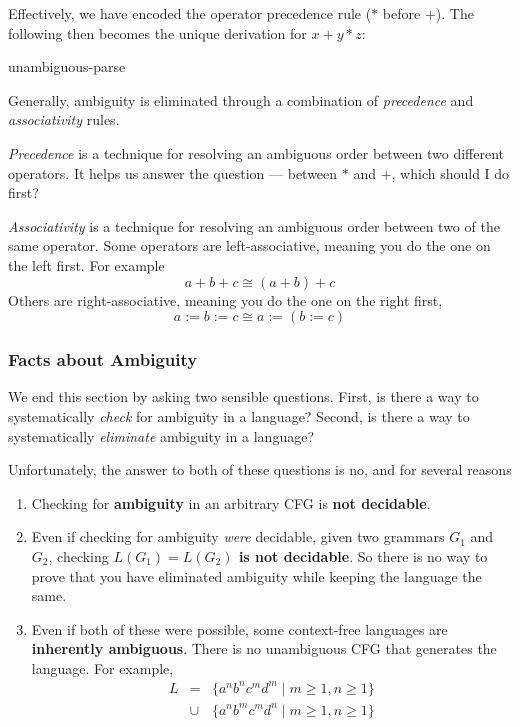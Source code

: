 Effectively, we have encoded the operator precedence rule ($*$ before $+$). The following then becomes the unique derivation for $x + y * z$:

\begin{center}
    {unambiguous-parse}
\end{center}

Generally, ambiguity is eliminated through a combination of \textit{precedence} and \textit{associativity} rules. 

\textit{Precedence} is a technique for resolving an ambiguous order between two different operators. It helps us answer the question --- between $*$ and $+$, which should I do first?

\textit{Associativity} is a technique for resolving an ambiguous order between two of the same operator. Some operators are left-associative, meaning you do the one on the left first. For example
\[a + b + c \cong (a + b) + c\]
Others are right-associative, meaning you do the one on the right first,
\[a := b := c \cong a:= (b := c) \]
\subsubsection{Facts about Ambiguity}
We end this section by asking two sensible questions. First, is there a way to systematically \textit{check} for ambiguity in a language? Second, is there a way to systematically \textit{eliminate} ambiguity in a language?

Unfortunately, the answer to both of these questions is no, and for several reasons
\begin{enumerate}
\item Checking for \textbf{ambiguity} in an arbitrary CFG is \textbf{not decidable}.
\item Even if checking for ambiguity \textit{were} decidable, given two grammars $G_1$ and $G_2$, checking
\textbf{$L(G_1) = L(G_2)$ is not decidable}. So there is no way to prove that you have eliminated ambiguity while keeping the language the same.
\item Even if both of these were possible, some context-free languages are \textbf{inherently ambiguous}. There is no unambiguous CFG that generates the language. For example,
\[
\begin{array}{lll}
  L &=& \{ a^nb^nc^md^m \mid m \ge 1, n \ge 1 \}\\
  &\cup& \{ a^nb^mc^md^n \mid m \ge 1, n \ge 1 \}
\end{array}
\]
\end{enumerate}

